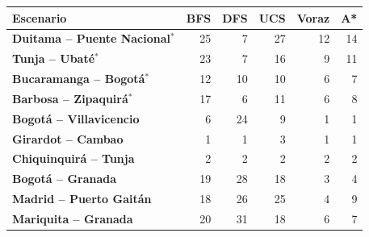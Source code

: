 \renewcommand{\arraystretch}{1.2}
\begin{tabular}{|l|r|r|r|r|r|}
\hline
\rowcolor{gray!20} \textbf{Escenario} & \textbf{BFS} & \textbf{DFS} & \textbf{UCS} & \textbf{Voraz} & \textbf{A*} \\
\hline
\textbf{Duitama -- Puente Nacional$^{*}$} & 25 & 7 & 27 & 12 & 14 \\
\hline
\textbf{Tunja -- Ubaté$^{*}$} & 23 & 7 & 16 & 9 & 11 \\
\hline
\textbf{Bucaramanga -- Bogotá$^{*}$} & 12 & 10 & 10 & 6 & 7 \\
\hline
\textbf{Barbosa -- Zipaquirá$^{*}$} & 17 & 6 & 11 & 6 & 8 \\
\hline
\textbf{Bogotá -- Villavicencio} & 6 & 24 & 9 & 1 & 1 \\
\hline
\textbf{Girardot -- Cambao} & 1 & 1 & 3 & 1 & 1 \\
\hline
\textbf{Chiquinquirá -- Tunja} & 2 & 2 & 2 & 2 & 2 \\
\hline
\textbf{Bogotá -- Granada} & 19 & 28 & 18 & 3 & 4 \\
\hline
\textbf{Madrid -- Puerto Gaitán} & 18 & 26 & 25 & 4 & 9 \\
\hline
\textbf{Mariquita -- Granada} & 20 & 31 & 18 & 6 & 7 \\
\hline
\end{tabular}
